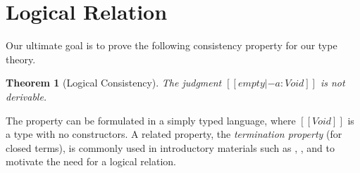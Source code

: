 \documentclass[\ifpublic nolinenum\else\fi,online,OA]{jfp}
\newcommand{\scw}[1]{}
\newcommand{\lang}{$\lambda^{\Pi}$\xspace}
\newtheorem{theorem}{Theorem}[section]
\theoremstyle{definition}
\begin{document}

\section{Logical Relation}
\label{sec:logreldep}

\scw{We need to explicitly point out that the key ideas of this paper are
  discussed, here, in this section.
  We need to explicitly remark on why logical relations are difficult to
  define for dependent type theory and explain why this setting is more
  difficult than with simple types (STLC) or with polymorphic types (System F).
  \begin{itemize}
  \item Large eliminations
  \item Definitional equality (not all types look like types)
  \end{itemize}
  Should we be more explicit in our comparison with Girard's trick for polymorphic type?
  There, the definition stays recursive because it doesn't substitute for the variables
  in the function types. But that approach is not available in this setting, because not
  all quantified things are types. And we might need that information to interpret, say,
  identity types in the right way.
}
\scw{ We also need to explicitly point out that our logical relation is untyped.
  This has two benefits: it allows semantic typing to be meaningful independent from
  syntactic typing (cite Derek, forward reference to next section) and it avoids
  significant bookkeeping, especially in the case of Kripke logical relations (we need to define
  what these are).
  Is there a cost to an untyped relation?
}

Our ultimate goal is to prove the following consistency property for our type theory.

\begin{theorem}[Logical Consistency]
  \label{theorem:consistency}
  The judgment $[[empty |- a : Void ]]$ is not derivable.
\end{theorem}
The property can be formulated in a simply typed language, where
$[[Void]]$ is a type with no constructors. A related
property, the \emph{termination property} (for closed terms),
is commonly used in introductory materials such as
\citet{skorstengaard2019introduction}, \citet{pierce2002types}, and
\citet{harpertait} to motivate the need for a logical relation.
\end{document}

